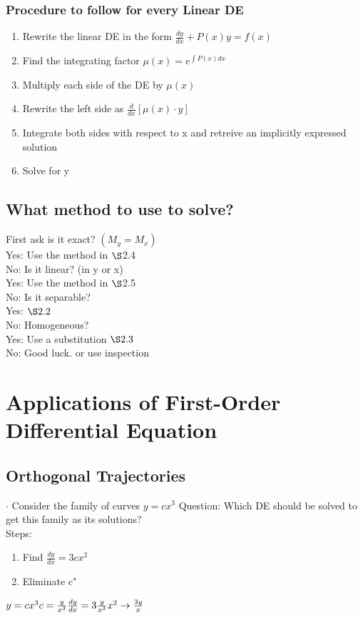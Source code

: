 \documentclass{article}
\begin{document}
\subsubsection{Procedure to follow for every Linear DE}
\begin{enumerate}
    \item Rewrite the linear DE in the form $\frac{dy}{dx}+P(x)y=f(x)$
    \item Find the integrating factor $\mu(x)=e^{\int P(x)dx}$
    \item Multiply each side of the DE by $\mu(x)$
    \item Rewrite the left side as $\frac{d}{dx} \left[\mu(x)\cdot y\right]$
    \item Integrate both sides with respect to x and retreive an implicitly expressed solution
    \item Solve for y
\end{enumerate}
\subsection{What method to use to solve?}
First ask is it exact? $(M_y=M_x)$
\\Yes: Use the method in $\S$2.4
\\No: Is it linear? (in y or x)
\\Yes: Use the method in $\S$2.5
\\No: Is it separable?
\\Yes: $\S 2.2$
\\No: Homogeneous?
\\Yes: Use a substitution $\S 2.3$
\\No: Good luck. or use inspection\pagebreak
\section{Applications of First-Order Differential Equation}
\subsection{Orthogonal Trajectories}
$\cdot$ Consider the family of curves $y=cx^3$
Question: Which DE should be solved to get this family as its solutions?
\\Steps:
\begin{enumerate}
    \item Find $\frac{dy}{dx} =3cx^2$
    \item Eliminate c"
\end{enumerate} $y=cx^3 c=\frac{y}{x^3} \\ \frac{dy}{dx}=3\frac{y}{x^3}x^2 \rightarrow \frac{3y}{x}$
\end{document}
